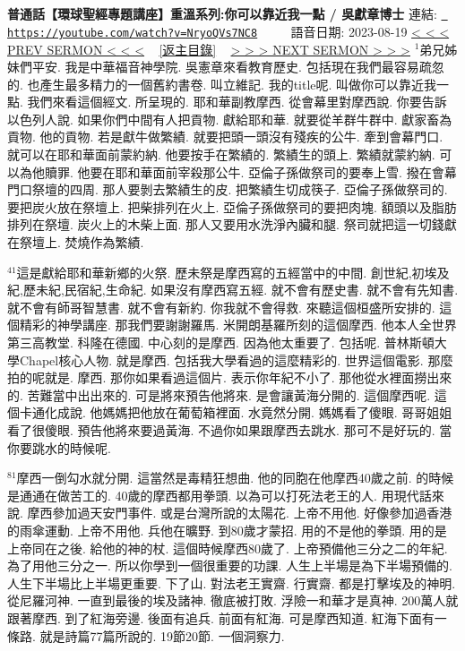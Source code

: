 \documentclass{book}
\begin{document}
\section{}
\label{sec:NryoQVs7NC8}
\textbf{普通話【環球聖經專題講座】重溫系列:你可以靠近我一點 / 吳獻章博士}
\newline
\newline
連結: \href{https://youtube.com/watch?v=NryoQVs7NC8}{\texttt{ https://youtube.com/watch?v=NryoQVs7NC8}} ~~~~ 語音日期: 2023-08-19 
\newline
\newline
\hyperref[sec:TijCCzqpfk8]{\small{< < < PREV SERMON < < <}}
~
\hyperref[sec:index]{\small{[返主目錄]}}
~
\hyperref[sec:E3VkyNG0obA]{\small{> > > NEXT SERMON > > >}}
\newline
\newline
$^{1}$弟兄姊妹們平安.
我是中華福音神學院.
吳憲章來看教育歷史.
包括現在我們最容易疏忽的.
也產生最多精力的一個舊約書卷.
叫立維記.
我的title呢.
叫做你可以靠近我一點.
我們來看這個經文.
所呈現的.
耶和華副教摩西.
從會幕里對摩西說.
你要告訴以色列人說.
如果你們中間有人把貢物.
獻給耶和華.
就要從羊群牛群中.
獻家畜為貢物.
他的貢物.
若是獻牛做繁績.
就要把頭一頭沒有殘疾的公牛.
牽到會幕門口.
就可以在耶和華面前蒙約納.
他要按手在繁績的.
繁績生的頭上.
繁績就蒙約納.
可以為他贖罪.
他要在耶和華面前宰殺那公牛.
亞倫子孫做祭司的要奉上雪.
撥在會幕門口祭壇的四周.
那人要剝去繁績生的皮.
把繁績生切成筷子.
亞倫子孫做祭司的.
要把炭火放在祭壇上.
把柴排列在火上.
亞倫子孫做祭司的要把肉塊.
額頭以及脂肪排列在祭壇.
炭火上的木柴上面.
那人又要用水洗淨內臟和腿.
祭司就把這一切錢獻在祭壇上.
焚燒作為繁績.

$^{41}$這是獻給耶和華新鄉的火祭.
歷未祭是摩西寫的五經當中的中間.
創世紀,初埃及紀,歷未紀,民宿紀,生命紀.
如果沒有摩西寫五經.
就不會有歷史書.
就不會有先知書.
就不會有師哥智慧書.
就不會有新約.
你我就不會得救.
來聽這個桓盛所安排的.
這個精彩的神學講座.
那我們要謝謝羅馬.
米開朗基羅所刻的這個摩西.
他本人全世界第三高教堂.
科隆在德國.
中心刻的是摩西.
因為他太重要了.
包括呢.
普林斯頓大學Chapel核心人物.
就是摩西.
包括我大學看過的這麼精彩的.
世界這個電影.
那麼拍的呢就是.
摩西.
那你如果看過這個片.
表示你年紀不小了.
那他從水裡面撈出來的.
苦難當中出出來的.
可是將來預告他將來.
是會讓黃海分開的.
這個摩西呢.
這個卡通化成說.
他媽媽把他放在葡萄箱裡面.
水竟然分開.
媽媽看了傻眼.
哥哥姐姐看了很傻眼.
預告他將來要過黃海.
不過你如果跟摩西去跳水.
那可不是好玩的.
當你要跳水的時候呢.

$^{81}$摩西一倒勾水就分開.
這當然是毒精狂想曲.
他的同胞在他摩西40歲之前.
的時候是通通在做苦工的.
40歲的摩西都用拳頭.
以為可以打死法老王的人.
用現代話來說.
摩西參加過天安門事件.
或是台灣所說的太陽花.
上帝不用他.
好像參加過香港的雨傘運動.
上帝不用他.
兵他在曠野.
到80歲才蒙招.
用的不是他的拳頭.
用的是上帝同在之後.
給他的神的杖.
這個時候摩西80歲了.
上帝預備他三分之二的年紀.
為了用他三分之一.
所以你學到一個很重要的功課.
人生上半場是為下半場預備的.
人生下半場比上半場更重要.
下了山.
對法老王實齋.
行實齋.
都是打擊埃及的神明.
從尼羅河神.
一直到最後的埃及諸神.
徹底被打敗.
浮險一和華才是真神.
200萬人就跟著摩西.
到了紅海旁邊.
後面有追兵.
前面有紅海.
可是摩西知道.
紅海下面有一條路.
就是詩篇77篇所說的.
19節20節.
一個洞察力.
\end{document}
